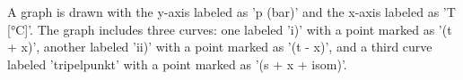 A graph is drawn with the y-axis labeled as 'p (bar)' and the x-axis labeled as 'T [°C]'. The graph includes three curves: one labeled 'i)' with a point marked as '(t + x)', another labeled 'ii)' with a point marked as '(t - x)', and a third curve labeled 'tripelpunkt' with a point marked as '(s + x + isom)'.